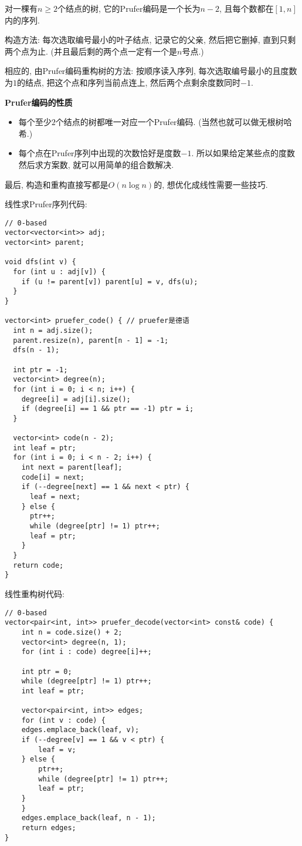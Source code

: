 对一棵有$n \ge 2$个结点的树, 它的Prufer编码是一个长为$n - 2$, 且每个数都在$[1, n]$内的序列.

构造方法: 每次选取编号最小的叶子结点, 记录它的父亲, 然后把它删掉, 直到只剩两个点为止. (并且最后剩的两个点一定有一个是$n$号点.)

相应的, 由Prufer编码重构树的方法: 按顺序读入序列, 每次选取编号最小的且度数为$1$的结点, 把这个点和序列当前点连上, 然后两个点剩余度数同时$-1$. 

\large\textbf{Prufer编码的性质}

\begin{itemize}
	\item 每个至少$2$个结点的树都唯一对应一个Prufer编码. (当然也就可以做无根树哈希.)
	\item 每个点在Prufer序列中出现的次数恰好是度数$-1$. 所以如果给定某些点的度数然后求方案数, 就可以用简单的组合数解决.
\end{itemize}


最后, 构造和重构直接写都是$O(n\log n)$的, 想优化成线性需要一些技巧.

线性求Prufer序列代码:
\begin{verbatim}
// 0-based
vector<vector<int>> adj;
vector<int> parent;

void dfs(int v) {
  for (int u : adj[v]) {
    if (u != parent[v]) parent[u] = v, dfs(u);
  }
}

vector<int> pruefer_code() { // pruefer是德语
  int n = adj.size();
  parent.resize(n), parent[n - 1] = -1;
  dfs(n - 1);

  int ptr = -1;
  vector<int> degree(n);
  for (int i = 0; i < n; i++) {
    degree[i] = adj[i].size();
    if (degree[i] == 1 && ptr == -1) ptr = i;
  }

  vector<int> code(n - 2);
  int leaf = ptr;
  for (int i = 0; i < n - 2; i++) {
    int next = parent[leaf];
    code[i] = next;
    if (--degree[next] == 1 && next < ptr) {
      leaf = next;
    } else {
      ptr++;
      while (degree[ptr] != 1) ptr++;
      leaf = ptr;
    }
  }
  return code;
}
\end{verbatim}

线性重构树代码:
\begin{verbatim}
// 0-based
vector<pair<int, int>> pruefer_decode(vector<int> const& code) {
	int n = code.size() + 2;
	vector<int> degree(n, 1);
	for (int i : code) degree[i]++;

	int ptr = 0;
	while (degree[ptr] != 1) ptr++;
	int leaf = ptr;

	vector<pair<int, int>> edges;
	for (int v : code) {
	edges.emplace_back(leaf, v);
	if (--degree[v] == 1 && v < ptr) {
		leaf = v;
	} else {
		ptr++;
		while (degree[ptr] != 1) ptr++;
		leaf = ptr;
	}
	}
	edges.emplace_back(leaf, n - 1);
	return edges;
}
\end{verbatim}